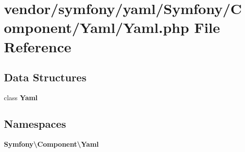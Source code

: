 \section{vendor/symfony/yaml/\+Symfony/\+Component/\+Yaml/\+Yaml.php File Reference}
\label{_yaml_8php}
\subsection*{Data Structures}
\begin{DoxyCompactItemize}
\item 
class {\bf Yaml}
\end{DoxyCompactItemize}
\subsection*{Namespaces}
\begin{DoxyCompactItemize}
\item 
 {\bf Symfony\textbackslash{}\+Component\textbackslash{}\+Yaml}
\end{DoxyCompactItemize}
